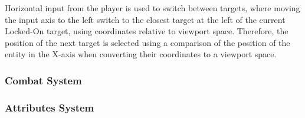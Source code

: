 Horizontal input from the player is used to switch between targets, where moving the input axis to the left switch to the closest target at the left of the current Locked-On target, using coordinates relative to viewport space. Therefore, the position of the next target is selected using a comparison of the position of the entity in the X-axis when converting their coordinates to a viewport space.

\subsubsection{Combat System}




\subsubsection{Attributes System}


